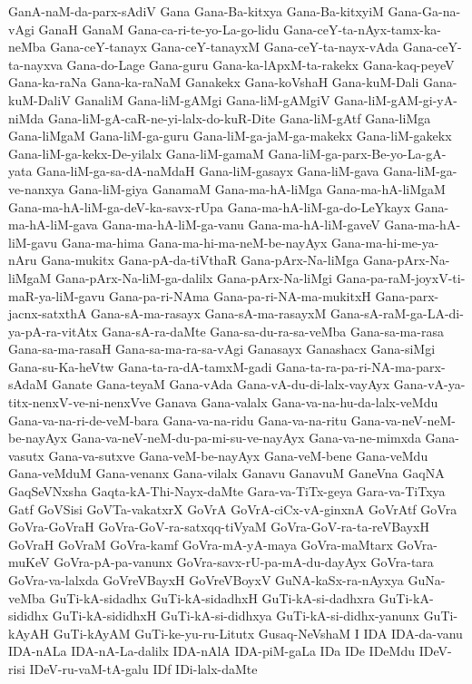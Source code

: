{GanA-naM-da-parx-sAdiV
Gana
Gana-Ba-kitxya
Gana-Ba-kitxyiM
Gana-Ga-na-vAgi
GanaH
GanaM
Gana-ca-ri-te-yo-La-go-lidu
Gana-ceY-ta-nAyx-tamx-ka-neMba
Gana-ceY-tanayx
Gana-ceY-tanayxM
Gana-ceY-ta-nayx-vAda
Gana-ceY-ta-nayxva
Gana-do-Lage
Gana-guru
Gana-ka-lApxM-ta-rakekx
Gana-kaq-peyeV
Gana-ka-raNa
Gana-ka-raNaM
Ganakekx
Gana-koVshaH
Gana-kuM-Dali
Gana-kuM-DaliV
GanaliM
Gana-liM-gAMgi
Gana-liM-gAMgiV
Gana-liM-gAM-gi-yA-niMda
Gana-liM-gA-caR-ne-yi-lalx-do-kuR-Dite
Gana-liM-gAtf
Gana-liMga
Gana-liMgaM
Gana-liM-ga-guru
Gana-liM-ga-jaM-ga-makekx
Gana-liM-gakekx
Gana-liM-ga-kekx-De-yilalx
Gana-liM-gamaM
Gana-liM-ga-parx-Be-yo-La-gA-yata
Gana-liM-ga-sa-dA-naMdaH
Gana-liM-gasayx
Gana-liM-gava
Gana-liM-ga-ve-nanxya
Gana-liM-giya
GanamaM
Gana-ma-hA-liMga
Gana-ma-hA-liMgaM
Gana-ma-hA-liM-ga-deV-ka-savx-rUpa
Gana-ma-hA-liM-ga-do-LeYkayx
Gana-ma-hA-liM-gava
Gana-ma-hA-liM-ga-vanu
Gana-ma-hA-liM-gaveV
Gana-ma-hA-liM-gavu
Gana-ma-hima
Gana-ma-hi-ma-neM-be-nayAyx
Gana-ma-hi-me-ya-nAru
Gana-mukitx
Gana-pA-da-tiVthaR
Gana-pArx-Na-liMga
Gana-pArx-Na-liMgaM
Gana-pArx-Na-liM-ga-dalilx
Gana-pArx-Na-liMgi
Gana-pa-raM-joyxV-ti-maR-ya-liM-gavu
Gana-pa-ri-NAma
Gana-pa-ri-NA-ma-mukitxH
Gana-parx-jacnx-satxthA
Gana-sA-ma-rasayx
Gana-sA-ma-rasayxM
Gana-sA-raM-ga-LA-di-ya-pA-ra-vitAtx
Gana-sA-ra-daMte
Gana-sa-du-ra-sa-veMba
Gana-sa-ma-rasa
Gana-sa-ma-rasaH
Gana-sa-ma-ra-sa-vAgi
Ganasayx
Ganashacx
Gana-siMgi
Gana-su-Ka-heVtw
Gana-ta-ra-dA-tamxM-gadi
Gana-ta-ra-pa-ri-NA-ma-parx-sAdaM
Ganate
Gana-teyaM
Gana-vAda
Gana-vA-du-di-lalx-vayAyx
Gana-vA-ya-titx-nenxV-ve-ni-nenxVve
Ganava
Gana-valalx
Gana-va-na-hu-da-lalx-veMdu
Gana-va-na-ri-de-veM-bara
Gana-va-na-ridu
Gana-va-na-ritu
Gana-va-neV-neM-be-nayAyx
Gana-va-neV-neM-du-pa-mi-su-ve-nayAyx
Gana-va-ne-mimxda
Gana-vasutx
Gana-va-sutxve
Gana-veM-be-nayAyx
Gana-veM-bene
Gana-veMdu
Gana-veMduM
Gana-venanx
Gana-vilalx
Ganavu
GanavuM
GaneVna
GaqNA
GaqSeVNxsha
Gaqta-kA-Thi-Nayx-daMte
Gara-va-TiTx-geya
Gara-va-TiTxya
Gatf
GoVSisi
GoVTa-vakatxrX
GoVrA
GoVrA-ciCx-vA-ginxnA
GoVrAtf
GoVra
GoVra-GoVraH
GoVra-GoV-ra-satxqq-tiVyaM
GoVra-GoV-ra-ta-reVBayxH
GoVraH
GoVraM
GoVra-kamf
GoVra-mA-yA-maya
GoVra-maMtarx
GoVra-muKeV
GoVra-pA-pa-vanunx
GoVra-savx-rU-pa-mA-du-dayAyx
GoVra-tara
GoVra-va-lalxda
GoVreVBayxH
GoVreVBoyxV
GuNA-kaSx-ra-nAyxya
GuNa-veMba
GuTi-kA-sidadhx
GuTi-kA-sidadhxH
GuTi-kA-si-dadhxra
GuTi-kA-sididhx
GuTi-kA-sididhxH
GuTi-kA-si-didhxya
GuTi-kA-si-didhx-yanunx
GuTi-kAyAH
GuTi-kAyAM
GuTi-ke-yu-ru-Litutx
Gusaq-NeVshaM
I
IDA
IDA-da-vanu
IDA-nALa
IDA-nA-La-dalilx
IDA-nAlA
IDA-piM-gaLa
IDa
IDe
IDeMdu
IDeV-risi
IDeV-ru-vaM-tA-galu
IDf
IDi-lalx-daMte
}
